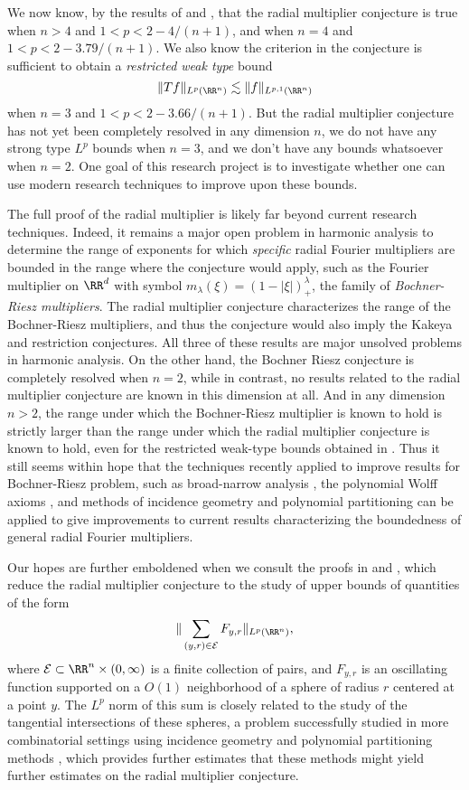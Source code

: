 We now know, by the results of \cite{HeoandNazarovandSeeger} and \cite{Cladek}, that the radial multiplier conjecture is true when $n > 4$ and $1 < p < 2 - 4/(n+1)$, and when $n = 4$ and $1 < p < 2 - 3.79/(n+1)$. We also know \cite{Cladek} the criterion in the conjecture is sufficient to obtain a \emph{restricted weak type} bound
%
\[ \| Tf \|_{L^p(\RR^n)} \lesssim \| f \|_{L^{p,1}(\RR^n)} \]
%
when $n = 3$ and $1 < p < 2 - 3.66/(n+1)$. But the radial multiplier conjecture has not yet been completely resolved in any dimension $n$, we do not have any strong type $L^p$ bounds when $n = 3$, and we don't have any bounds whatsoever when $n = 2$. One goal of this research project is to investigate whether one can use modern research techniques to improve upon these bounds.

The full proof of the radial multiplier is likely far beyond current research techniques. Indeed, it remains a major open problem in harmonic analysis to determine the range of exponents for which \emph{specific} radial Fourier multipliers are bounded in the range where the conjecture would apply, such as the Fourier multiplier on $\RR^d$ with symbol $m_\lambda(\xi) = \left( 1 - |\xi| \right)^\lambda_+$, the family of \emph{Bochner-Riesz multipliers}. The radial multiplier conjecture characterizes the range of the Bochner-Riesz multipliers, and thus the conjecture would also imply the Kakeya and restriction conjectures. All three of these results are major unsolved problems in harmonic analysis. On the other hand, the Bochner Riesz conjecture is completely resolved when $n = 2$, while in contrast, no results related to the radial multiplier conjecture are known in this dimension at all. And in any dimension $n > 2$, the range under which the Bochner-Riesz multiplier is known to hold \cite{GuoandOhandWangandWuandZhang} is strictly larger than the range under which the radial multiplier conjecture is known to hold, even for the restricted weak-type bounds obtained in \cite{Cladek}. Thus it still seems within hope that the techniques recently applied to improve results for Bochner-Riesz problem, such as broad-narrow analysis \cite{BourgainandGuth}, the polynomial Wolff axioms \cite{KatzandRogers}, and methods of incidence geometry and polynomial partitioning \cite{Zahl2} can be applied to give improvements to current results characterizing the boundedness of general radial Fourier multipliers.

Our hopes are further emboldened when we consult the proofs in \cite{HeoandNazarovandSeeger} and \cite{Cladek}, which reduce the radial multiplier conjecture to the study of upper bounds of quantities of the form
%
\[ \| \sum_{(y,r) \in \mathcal{E}} F_{y,r} \|_{L^p(\RR^n)}, \]
%
where $\mathcal{E} \subset \RR^n \times (0,\infty)$ is a finite collection of pairs, and $F_{y,r}$ is an oscillating function supported on a $O(1)$ neighborhood of a sphere of radius $r$ centered at a point $y$. The $L^p$ norm of this sum is closely related to the study of the tangential intersections of these spheres, a problem successfully studied in more combinatorial settings using incidence geometry and polynomial partitioning methods \cite{Zahl}, which provides further estimates that these methods might yield further estimates on the radial multiplier conjecture.


